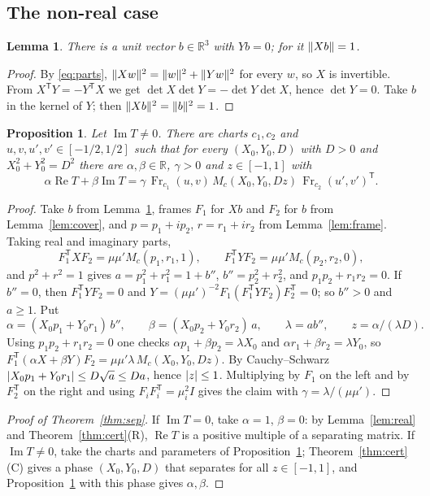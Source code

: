 \documentclass[11pt]{article}
\newtheorem{lemma}[theorem]{Lemma}
\newtheorem{proposition}[theorem]{Proposition}
\theoremstyle{definition}
\theoremstyle{remark}
\newcommand{\R}{\mathbb{R}}
\newcommand{\Fr}{\operatorname{Fr}}
\newcommand{\re}{\operatorname{Re}}
\newcommand{\im}{\operatorname{Im}}
\newcommand{\T}{\mathsf T}
\DeclarePairedDelimiter{\abs}{\lvert}{\rvert}
\DeclarePairedDelimiter{\norm}{\lVert}{\rVert}
\begin{document}
\subsection{The non-real case}

\begin{lemma}\label{lem:ker}
There is a unit vector $b\in\R^3$ with $Yb=0$; for it $\norm{Xb}=1$.
\end{lemma}

\begin{proof}
By \eqref{eq:parts}, $\norm{Xw}^2=\norm w^2+\norm{Yw}^2$ for every $w$, so $X$ is invertible. From
$X^{\T}Y=-Y^{\T}X$ we get $\det X\det Y=-\det Y\det X$, hence $\det Y=0$. Take $b$ in the kernel of
$Y$; then $\norm{Xb}^2=\norm b^2=1$.
\end{proof}

\begin{proposition}\label{prop:span}
Let $\im T\neq0$. There are charts $c_1,c_2$ and $u,v,u',v'\in[-1/2,1/2]$ such that for every
$(X_0,Y_0,D)$ with $D>0$ and $X_0^2+Y_0^2=D^2$ there are $\alpha,\beta\in\R$, $\gamma>0$ and $z\in[-1,1]$
with
\[
  \alpha\re T+\beta\im T=\gamma\,\Fr_{c_1}(u,v)\,M_c(X_0,Y_0,Dz)\,\Fr_{c_2}(u',v')^{\T}.
\]
\end{proposition}

\begin{proof}
Take $b$ from Lemma~\ref{lem:ker}, frames $F_1$ for $Xb$ and $F_2$ for $b$ from
Lemma~\ref{lem:cover}, and $p=p_1+ip_2$, $r=r_1+ir_2$ from Lemma~\ref{lem:frame}. Taking real
and imaginary parts,
\[
  F_1^{\T}XF_2=\mu\mu'M_c(p_1,r_1,1),\qquad F_1^{\T}YF_2=\mu\mu'M_c(p_2,r_2,0),
\]
and $p^2+r^2=1$ gives $a=p_1^2+r_1^2=1+b''$, $b''=p_2^2+r_2^2$, and $p_1p_2+r_1r_2=0$. If $b''=0$,
then $F_1^{\T}YF_2=0$ and $Y=(\mu\mu')^{-2}F_1(F_1^{\T}YF_2)F_2^{\T}=0$; so $b''>0$ and $a\ge1$. Put
\[
  \alpha=(X_0p_1+Y_0r_1)\,b'',\qquad \beta=(X_0p_2+Y_0r_2)\,a,\qquad \lambda=ab'',\qquad
  z=\alpha/(\lambda D).
\]
Using $p_1p_2+r_1r_2=0$ one checks $\alpha p_1+\beta p_2=\lambda X_0$ and $\alpha r_1+\beta r_2=\lambda Y_0$,
so $F_1^{\T}(\alpha X+\beta Y)F_2=\mu\mu'\lambda\,M_c(X_0,Y_0,Dz)$. By Cauchy--Schwarz
$\abs{X_0p_1+Y_0r_1}\le D\sqrt a\le Da$, hence $\abs z\le1$. Multiplying by $F_1$ on the left and by
$F_2^{\T}$ on the right and using $F_iF_i^{\T}=\mu_i^2I$ gives the claim with
$\gamma=\lambda/(\mu\mu')$.
\end{proof}

\begin{proof}[Proof of Theorem~\ref{thm:sep}]
If $\im T=0$, take $\alpha=1$, $\beta=0$: by Lemma~\ref{lem:real} and Theorem~\ref{thm:cert}(R),
$\re T$ is a positive multiple of a separating matrix. If $\im T\neq0$, take the charts and parameters
of Proposition~\ref{prop:span}; Theorem~\ref{thm:cert}(C) gives a phase $(X_0,Y_0,D)$ that separates
for all $z\in[-1,1]$, and Proposition~\ref{prop:span} with this phase gives $\alpha,\beta$.
\end{proof}
\end{document}
